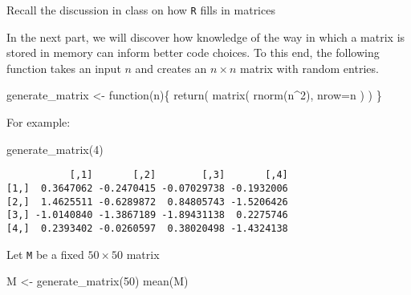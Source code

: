 \documentclass[
  letterpaper,
  DIV=11,
  numbers=noendperiod]{scrartcl}
\newenvironment{Shaded}{\begin{snugshade}}{\end{snugshade}}
\newcommand{\AttributeTok}[1]{\textcolor[rgb]{0.40,0.45,0.13}{#1}}
\newcommand{\ControlFlowTok}[1]{\textcolor[rgb]{0.00,0.23,0.31}{#1}}
\newcommand{\DecValTok}[1]{\textcolor[rgb]{0.68,0.00,0.00}{#1}}
\newcommand{\FunctionTok}[1]{\textcolor[rgb]{0.28,0.35,0.67}{#1}}
\newcommand{\NormalTok}[1]{\textcolor[rgb]{0.00,0.23,0.31}{#1}}
\newcommand{\OtherTok}[1]{\textcolor[rgb]{0.00,0.23,0.31}{#1}}
\newcommand{\SpecialCharTok}[1]{\textcolor[rgb]{0.37,0.37,0.37}{#1}}
\begin{document}
\begin{tcolorbox}[enhanced jigsaw, leftrule=.75mm, breakable, colframe=quarto-callout-warning-color-frame, coltitle=black, colback=white, opacitybacktitle=0.6, colbacktitle=quarto-callout-warning-color!10!white, left=2mm, titlerule=0mm, bottomtitle=1mm, bottomrule=.15mm, title=\textcolor{quarto-callout-warning-color}{\faExclamationTriangle}\hspace{0.5em}{Tip}, arc=.35mm, rightrule=.15mm, toptitle=1mm, toprule=.15mm, opacityback=0]

Recall the discussion in class on how \texttt{R} fills in matrices

\end{tcolorbox}

In the next part, we will discover how knowledge of the way in which a
matrix is stored in memory can inform better code choices. To this end,
the following function takes an input \(n\) and creates an
\(n \times n\) matrix with random entries.

\begin{Shaded}
\begin{Highlighting}[]
\NormalTok{generate\_matrix }\OtherTok{\textless{}{-}} \ControlFlowTok{function}\NormalTok{(n)\{}
    \FunctionTok{return}\NormalTok{(}
        \FunctionTok{matrix}\NormalTok{(}
            \FunctionTok{rnorm}\NormalTok{(n}\SpecialCharTok{\^{}}\DecValTok{2}\NormalTok{),}
            \AttributeTok{nrow=}\NormalTok{n}
\NormalTok{        )}
\NormalTok{    )}
\NormalTok{\}}
\end{Highlighting}
\end{Shaded}

For example:

\begin{Shaded}
\begin{Highlighting}[]
\FunctionTok{generate\_matrix}\NormalTok{(}\DecValTok{4}\NormalTok{)}
\end{Highlighting}
\end{Shaded}

\begin{verbatim}
           [,1]       [,2]        [,3]       [,4]
[1,]  0.3647062 -0.2470415 -0.07029738 -0.1932006
[2,]  1.4625511 -0.6289872  0.84805743 -1.5206426
[3,] -1.0140840 -1.3867189 -1.89431138  0.2275746
[4,]  0.2393402 -0.0260597  0.38020498 -1.4324138
\end{verbatim}

Let \texttt{M} be a fixed \(50 \times 50\) matrix

\begin{Shaded}
\begin{Highlighting}[]
\NormalTok{M }\OtherTok{\textless{}{-}} \FunctionTok{generate\_matrix}\NormalTok{(}\DecValTok{50}\NormalTok{)}
\FunctionTok{mean}\NormalTok{(M)}
\end{Highlighting}
\end{Shaded}
\end{document}
